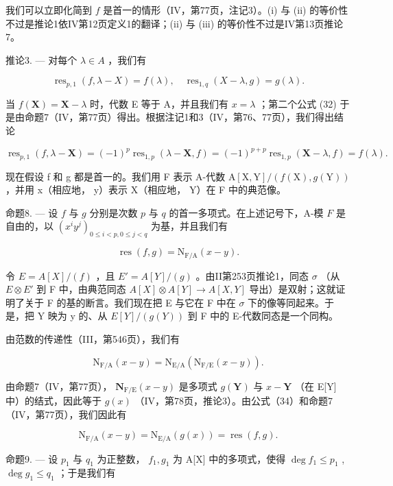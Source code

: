 我们可以立即化简到 \(f\) 是首一的情形（IV，第77页，注记3）。(i) 与 (ii) 的等价性不过是推论1依IV第12页定义1的翻译；(ii) 与 (iii) 的等价性不过是IV第13页推论7。

推论3. --- 对每个 \(\lambda \in A\) ，我们有

\[
\operatorname{res} _ {p, 1} (f, \lambda - X) = f (\lambda), \quad \operatorname{res} _ {1, q} (X - \lambda , g) = g (\lambda).\tag{32}
\]

当 \(f(\mathbf{X}) = \mathbf{X} - \lambda\) 时，代数 E 等于 A，并且我们有 \(x = \lambda\) ；第二个公式 (32) 于是由命题7（IV，第77页）得出。根据注记1和3（IV，第76、77页），我们得出结论

\[
\operatorname{res} _ {p, 1} (f, \lambda - \mathbf {X}) = (- 1) ^ {p} \operatorname{res} _ {1, p} (\lambda - \mathbf {X}, f) = (- 1) ^ {p + p} \operatorname{res} _ {1, p} (\mathbf {X} - \lambda , f) = f (\lambda).
\]

现在假设 f 和 g 都是首一的。我们用 F 表示 A-代数 \(\mathrm{A}[\mathrm{X},\mathrm{Y}]/(f(\mathrm{X}),g(\mathrm{Y}))\) ，并用 x（相应地， y）表示 X（相应地， Y）在 F 中的典范像。

命题8. --- 设 \(f\) 与 \(g\) 分别是次数 \(p\) 与 \(q\) 的首一多项式。在上述记号下，A-模 \(F\) 是自由的，以 \((x^i y^j)_{0 \leq i < p, 0 \leq j < q}\) 为基，并且我们有

\[
\operatorname{res} (f, g) = \mathrm{N} _ {\mathrm{F/A}} (x - y).\tag{33}
\]

令 \(E = A[X]/(f)\) ，且 \(E' = A[Y]/(g)\) 。由II第253页推论1，同态 \(\sigma\) （从 \(E \otimes E'\) 到 F 中，由典范同态 \(A[X] \otimes A[Y] \to A[X,Y]\) 导出）是双射；这就证明了关于 F 的基的断言。我们现在把 E 与它在 F 中在 \(\sigma\) 下的像等同起来。于是，把 Y 映为 y 的、从 \(E[Y]/(g(Y))\) 到 F 中的 E-代数同态是一个同构。

由范数的传递性（III，第546页），我们有

\[
\mathrm{N} _ {\mathrm{F/A}} (x - y) = \mathrm{N} _ {\mathrm{E/A}} (\mathrm{N} _ {\mathrm{F/E}} (x - y)).\tag{34}
\]

由命题7（IV，第77页）， \(\mathbf{N}_{\mathrm{F / E}}(x - y)\) 是多项式 \(g(\mathbf{Y})\) 与 \(x - \mathbf{Y}\) （在 E{[}Y{]} 中）的结式，因此等于 \(g(x)\) （IV，第78页，推论3）。由公式（34）和命题7（IV，第77页），我们因此有

\[
\mathrm{N} _ {\mathrm{F/A}} (x - y) = \mathrm{N} _ {\mathrm{E/A}} (g (x)) = \operatorname{res} (f, g).
\]

命题9. --- 设 \(p_1\) 与 \(q_1\) 为正整数， \(f_1, g_1\) 为 A{[}X{]} 中的多项式，使得 \(\deg f_1 \leqslant p_1\) , \(\deg g_1 \leqslant q_1\) ；于是我们有

